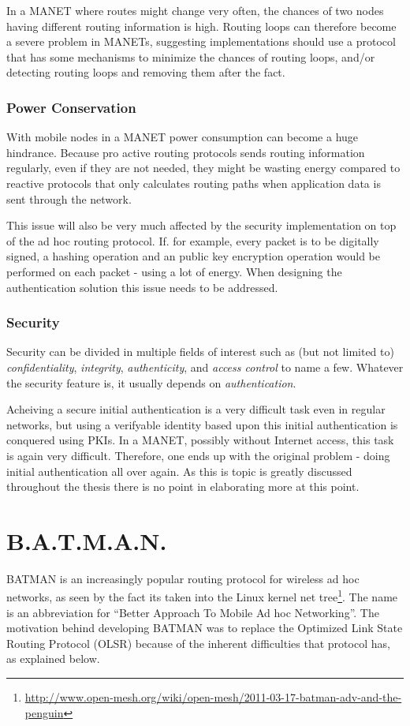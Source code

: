 In a \ac{MANET} where routes might change very often, the chances of two nodes
having different routing information is high. Routing loops can therefore become
a severe problem in \acp{MANET}, suggesting implementations should use a
protocol that has some mechanisms to minimize the chances of routing loops,
and/or detecting routing loops and removing them after the fact.

\subsubsection*{Power Conservation}
With mobile nodes in a \ac{MANET} power consumption can become a huge hindrance.
Because pro active routing protocols sends routing information regularly, even
if they are not needed, they might be wasting energy compared to reactive
protocols that only calculates routing paths when application data is sent
through the network.

This issue will also be very much affected by the security implementation on top
of the ad hoc routing protocol. If. for example, every packet is to be digitally
signed, a hashing operation and an public key encryption operation would be
performed on each packet - using a lot of energy. When designing the
authentication solution this issue needs to be addressed.

\subsubsection*{Security}
Security can be divided in multiple fields of interest such as (but not limited
to) \textit{confidentiality}, \textit{integrity}, \textit{authenticity}, and
\textit{access control} to name a few. Whatever the security feature is, it
usually depends on \emph{authentication}.

Acheiving a secure initial authentication is a very difficult task even in
regular networks, but using a verifyable identity based upon this initial
authentication is conquered using \acp{PKI}. In a \ac{MANET}, possibly without
Internet access, this task is again very difficult. Therefore, one ends
up with the original problem - doing initial authentication all over again. As this
is topic is greatly discussed throughout the thesis there is no point in
elaborating more at this point.

\section{B.A.T.M.A.N.}
BATMAN \cite{batman_rfc} is an increasingly popular routing protocol for
wireless ad hoc networks, as seen by the fact its taken into the Linux kernel
net tree\footnote{\url{http://www.open-mesh.org/wiki/open-mesh/2011-03-17-batman-adv-and-the-penguin}}.
The name is an abbreviation for ``Better Approach To Mobile Ad hoc
Networking''. The motivation behind developing BATMAN was to replace the
Optimized Link State Routing Protocol (OLSR) \cite{why-starting-batman} because
of the inherent difficulties that protocol has, as explained below.

